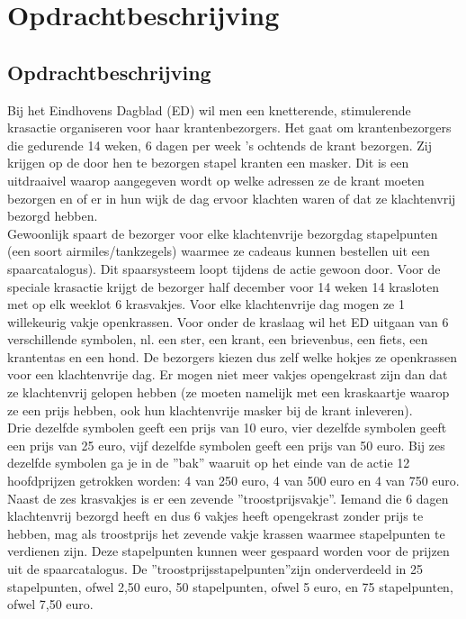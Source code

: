 \chapter{Opdrachtbeschrijving}\label{cha:scratch-off-lottery}

\section{Opdrachtbeschrijving}

Bij het Eindhovens Dagblad (ED) wil men een knetterende, stimulerende krasactie organiseren
voor haar krantenbezorgers.
Het gaat om krantenbezorgers die gedurende 14 weken, 6 dagen per week ’s ochtends
de krant bezorgen. Zij krijgen op de door hen te bezorgen stapel kranten een
masker. Dit is een uitdraaivel waarop aangegeven wordt op welke adressen ze de krant
moeten bezorgen en of er in hun wijk de dag ervoor klachten waren of dat ze klachtenvrij
bezorgd hebben.\\

Gewoonlijk spaart de bezorger voor elke klachtenvrije bezorgdag
stapelpunten (een soort airmiles/tankzegels) waarmee ze cadeaus kunnen bestellen uit
een spaarcatalogus). Dit spaarsysteem loopt tijdens de actie gewoon door.
Voor de speciale krasactie krijgt de bezorger half december voor 14 weken 14 krasloten
met op elk weeklot 6 krasvakjes. Voor elke klachtenvrije dag mogen ze 1 willekeurig vakje
openkrassen. Voor onder de kraslaag wil het ED uitgaan van 6 verschillende symbolen,
nl. een ster, een krant, een brievenbus, een fiets, een krantentas en een hond. De
bezorgers kiezen dus zelf welke hokjes ze openkrassen voor een klachtenvrije dag. Er
mogen niet meer vakjes opengekrast zijn dan dat ze klachtenvrij gelopen hebben (ze
moeten namelijk met een kraskaartje waarop ze een prijs hebben, ook hun klachtenvrije
masker bij de krant inleveren).\\

 Drie dezelfde symbolen geeft een prijs van 10 euro, vier
dezelfde symbolen geeft een prijs van 25 euro, vijf dezelfde symbolen geeft een prijs van
50 euro. Bij zes dezelfde symbolen ga je in de ”bak” waaruit op het einde van de actie 12 hoofdprijzen getrokken worden: 4 van 250 euro, 4 van 500 euro en 4 van 750 euro.
Naast de zes krasvakjes is er een zevende ”troostprijsvakje”. Iemand die 6 dagen
klachtenvrij bezorgd heeft en dus 6 vakjes heeft opengekrast zonder prijs te hebben,
mag als troostprijs het zevende vakje krassen waarmee stapelpunten te verdienen zijn.
Deze stapelpunten kunnen weer gespaard worden voor de prijzen uit de spaarcatalogus.
De ”troostprijsstapelpunten”zijn onderverdeeld in 25 stapelpunten, ofwel 2,50 euro, 50
stapelpunten, ofwel 5 euro, en 75 stapelpunten, ofwel 7,50 euro.\\

